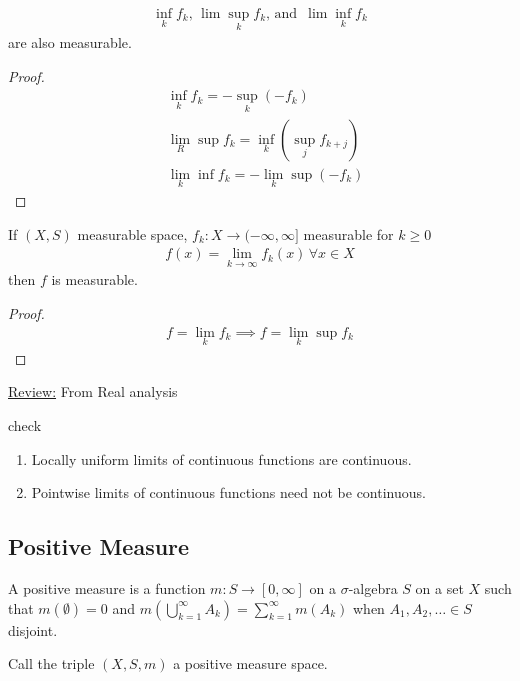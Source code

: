 \begin{corollary}
	\begin{align*}
		\inf_k f_k, \, \lim \sup_k f_k, \, \text{and } \, \lim \inf_k f_k
	\end{align*} are also measurable.
\end{corollary}

\begin{proof}
	\begin{align*}
		&\inf_k f_k = - \sup_{k} (-f_k) \\
		&\lim_{R} \sup f_k = \inf_{k} (\sup_{j} f_{k+j}) \\
		&\lim_{k}\inf f_k = - \lim_{k} \sup (-f_k)
	\end{align*}
\end{proof}

\begin{corollary}
	If $(X,S)$ measurable space, $f_k : X \to (-\infty, \infty]$ measurable for  $k \geq 0$
	 \begin{align*}
	    f (x) = \lim_{k \to  \infty} f_k (x) \, \forall x \in X
	\end{align*} then $f$ is measurable.
\end{corollary}

\begin{proof}
	 \begin{align*}
	f = \lim_{k} f_k \implies f = \lim_{k} \sup f_k
	\end{align*}
\end{proof}

\underline{Review:} From Real analysis

check
\begin{enumerate}
	\item Locally uniform limits of continuous functions are continuous.
	\item Pointwise limits of continuous functions need not be continuous.
\end{enumerate}

\subsection{Positive Measure}

\begin{definition}
	A positive measure is a function $m : S \to [0, \infty]$ on a $\sigma$-algebra $S$ on a set $X$ such that $m(\emptyset) = 0$
	and $m( \bigcup_{k=1}^{\infty} A_k) = \sum_{k=1}^{\infty} m(A_k)$ when
	$A_1, A_2, \ldots \in S$ disjoint.

	Call the triple $(X,S,m)$ a positive measure space.
\end{definition}

